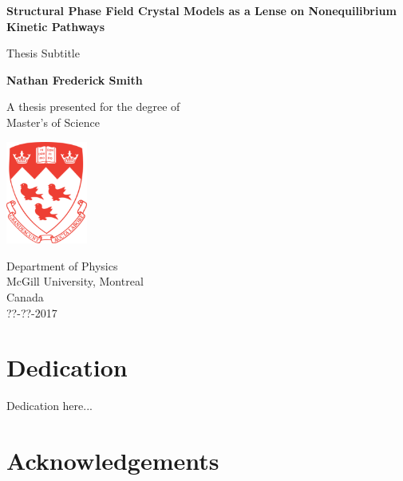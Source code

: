 \documentclass[12pt, letterpaper]{report}
\begin{document}
\begin{titlepage}
    \begin{center}
        \vspace*{1cm}
        
        \Huge
        \textbf{Structural Phase Field Crystal Models as a Lense on Nonequilibrium Kinetic Pathways}
        
        \vspace{0.5cm}
        \LARGE
        Thesis Subtitle
        
        \vspace{1.5cm}
        
        \textbf{Nathan Frederick Smith}
        
        \vfill
        
        A thesis presented for the degree of\\
        Master's of Science
        
        \vspace{0.8cm}
        
        \includegraphics[width=0.2\textwidth]{crest.eps}
        
        \Large
        Department of Physics\\
        McGill University, Montreal\\
        Canada\\
        ??-??-2017
        
    \end{center}
\end{titlepage}

\doublespacing

\section*{Dedication}
\label{sec:dedication}

Dedication here...

\clearpage

\section*{Acknowledgements}
\label{sec:acknowledgements}
\end{document}
